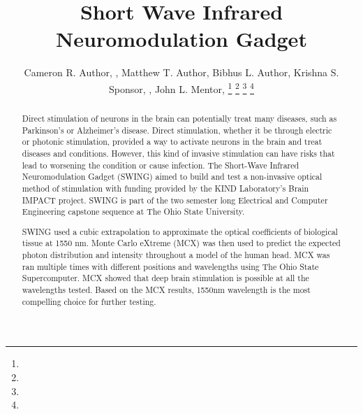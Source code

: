 \documentclass[journal,twoside,web]{ieeecolor}
\begin{document}
\title{Short Wave Infrared Neuromodulation Gadget}
\author{Cameron R. Author, , Matthew T. Author, Bibhus L. Author, 
        Krishna S. Sponsor, , John L. Mentor, 
\thanks{ }
\thanks{ }
\thanks{ }
\thanks{ }}

\maketitle

\begin{abstract}
Direct stimulation of neurons in the brain can potentially treat many diseases, such as Parkinson's  
or Alzheimer's disease. Direct stimulation, whether it be through electric or photonic stimulation,  
provided a way to activate neurons in the brain and treat diseases and conditions. However, this kind  
of invasive stimulation can have risks that lead to worsening the condition or cause infection.  
The Short-Wave Infrared Neuromodulation Gadget (SWING) aimed to build and test a non-invasive optical method  
of stimulation with funding provided by the KIND Laboratory's Brain IMPACT project. SWING is part of the  
two semester long Electrical and Computer Engineering capstone sequence at The Ohio State University. 

SWING used a cubic extrapolation to approximate the optical coefficients of biological tissue at 1550 nm. 
Monte Carlo eXtreme (MCX) was then used to predict the expected photon distribution and intensity throughout a model 
of the human head. MCX was ran multiple times with different positions and wavelengths using The Ohio State Supercomputer. 
MCX showed that deep brain stimulation is possible at all the wavelengths tested. Based on the MCX results, 1550nm wavelength 
is the most compelling choice for further testing.
\end{abstract}

\begin{IEEEkeywords}

\end{IEEEkeywords}
\end{document}
